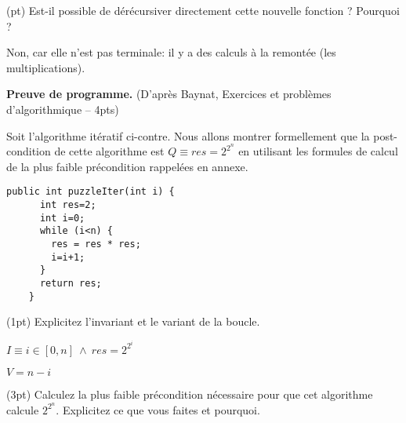 \documentclass[10pt]{article}\usepackage[correction,nu]{esial}
\begin{document}
\Question(\textonehalf pt) Est-il possible de dérécursiver directement cette
nouvelle fonction ? Pourquoi ? 

\begin{Reponse}
  Non, car elle n'est pas terminale: il y a des calculs à la remontée (les multiplications). 
\end{Reponse}

\Exercice\textbf{Preuve de programme.} (D'après Baynat, Exercices et problèmes d'algorithmique -- 4pts)

\medskip\noindent%
\begin{minipage}{.55\linewidth}
  Soit l'algorithme itératif ci-contre. Nous allons montrer formellement que la
  post-condition de cette algorithme est $Q\equiv res=2^{2^n}$
  en utilisant les formules de calcul de la plus faible précondition rappelées
  en annexe.
\end{minipage}\hfill%
\begin{minipage}{.4\linewidth}
  \begin{Verbatim}[gobble=4,numbers=right]
    public int puzzleIter(int i) {
      int res=2;
      int i=0;
      while (i<n) {
        res = res * res;
        i=i+1;
      }
      return res;
    }    
  \end{Verbatim}
\end{minipage}

\Question(1pt) Explicitez l'invariant et le variant de la boucle.

\begin{Reponse}
  $I\equiv i\in[0,n] ~\wedge~ res=2^{2^i}$

  $V=n-i$
\end{Reponse}

\Question(3pt) Calculez la plus faible précondition nécessaire pour que cet
algorithme calcule $2^{2^n}$. Explicitez ce que vous faites et pourquoi.
\end{document}
